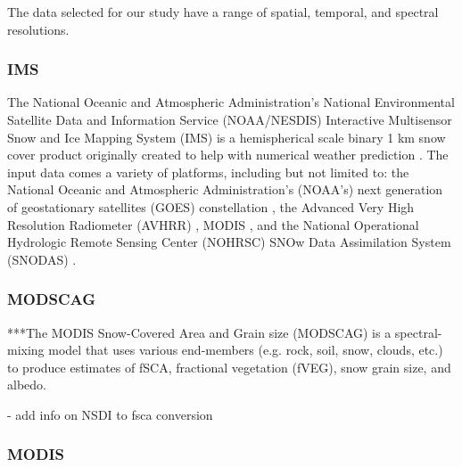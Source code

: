 The data selected for our study have a range of spatial, temporal, and spectral resolutions. 

\clearpage
\hypertarget{ch4-methods-3}{\subsubsection{IMS}\label{ch4-methods-3}}


The National Oceanic and Atmospheric Administration’s National Environmental Satellite Data and Information Service (NOAA/NESDIS) Interactive Multisensor Snow and Ice Mapping System (IMS) is a hemispherical scale binary 1 km snow cover product originally created to help with numerical weather prediction 
\citep{ramsayInteractiveMultisensorSnow1998, helfrichEnhancementsForthcomingDevelopments2007}. The input data comes a variety of platforms, including but not limited to: the National Oceanic and Atmospheric Administration's (NOAA's) next generation of geostationary satellites (GOES) constellation \citep{menzelIntroducingGOESIFirst1994}, the Advanced Very High Resolution Radiometer (AVHRR) \citep{cracknellAdvancedVeryHigh1997}, MODIS \citep{salomonsonMODISAdvancedFacility1989}, and the National Operational Hydrologic Remote Sensing Center (NOHRSC) SNOw Data Assimilation System (SNODAS) \citep{barrettandrewNationalOperationalHydrologic2003}.

\hypertarget{ch4-methods-4}{\subsubsection{MODSCAG}\label{ch4-methods-4}}


***The MODIS Snow-Covered Area and Grain size (MODSCAG) \citep{painterRetrievalSubpixelSnow2009} is a spectral-mixing model that uses various end-members (e.g. rock, soil, snow, clouds, etc.) to produce estimates of fSCA, fractional vegetation (fVEG), snow grain size, and albedo.

- add info on NSDI to fsca conversion \citep{salomonsonEstimatingFractionalSnow2004}


\hypertarget{ch4-methods-5}{\subsubsection{MODIS}\label{ch4-methods-5}}

